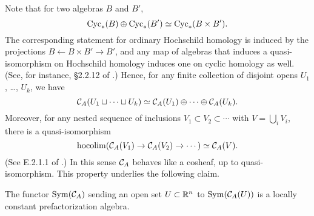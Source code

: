 \documentclass[11pt]{amsart}
\numberwithin{equation}{section}
\def\owen{\textcolor{magenta}{OG: }\textcolor{magenta}}
\begin{document}
Note that for two algebras $B$ and $B'$,
\[
{\rm Cyc}_*(B) \oplus {\rm Cyc}_*(B') \simeq {\rm Cyc}_*(B \times B') .
\] 
The corresponding statement for ordinary Hochschild homology is induced by the projections $B \leftarrow B \times B' \to B'$, and any map of algebras that induces a quasi-isomorphism on Hochschild homology induces one on cyclic homology as well.
(See, for instance, \S2.2.12 of \cite{LodayCyclic}.)
Hence, for any finite collection of disjoint opens $U_1$, \dots, $U_k$, 
we have
\[
\mathcal C_A(U_1 \sqcup \cdots \sqcup U_k) \simeq \mathcal C_A(U_1) \oplus \cdots \oplus \mathcal C_A(U_k).
\]
Moreover, for any nested sequence of inclusions $V_1 \subset V_2 \subset \cdots$ with $V = \bigcup_i V_i$,
there is a quasi-isomorphism
\[
{\rm hocolim}(\mathcal C_A(V_1) \to \mathcal C_A(V_2) \to \cdots) \simeq \mathcal C_A(V).
\]
(See E.2.1.1 of \cite{LodayCyclic}.)
In this sense $\mathcal C_A$ behaves like a cosheaf, up to quasi-isomorphism. 
This property underlies the following claim.

\begin{lmm}
\label{lem: cycfact}
The functor ${\rm Sym}(\mathcal C_A)$ sending an open set $U \subset \mathbb R^n$ to ${\rm Sym}(\mathcal C_A(U))$ is a locally constant prefactorization algebra.
\end{lmm}

\end{document}
